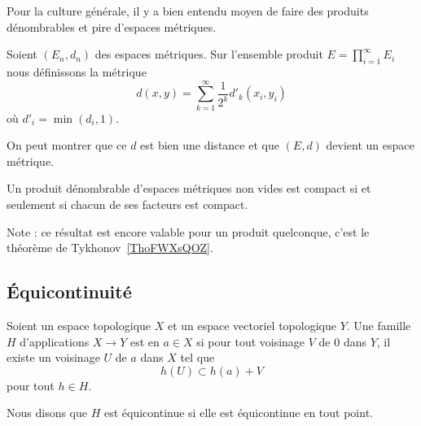 Pour la culture générale, il y a bien entendu moyen de faire des produits dénombrables et pire d'espaces métriques.
\begin{definition}
	Soient \( (E_n,d_n)\) des espaces métriques. Sur l'ensemble produit \( E=\prod_{i=1}^{\infty}E_i\) nous définissons la métrique
	\begin{equation}
		d(x,y)=\sum_{k=1}^{\infty}\frac{1}{ 2^k }d'_k(x_i,y_i)
	\end{equation}
	où \( d'_i=\min(d_i,1)\).
\end{definition}
On peut montrer que ce \( d\) est bien une distance et que \( (E,d)\) devient un espace métrique.

\begin{theorem} \label{ThoKKBooNaZgoO}  %
	Un produit dénombrable d'espaces métriques non vides est compact si et seulement si chacun de ses facteurs est compact.
\end{theorem}
Note : ce résultat est encore valable pour un produit quelconque, c'est le théorème de Tykhonov~\ref{ThoFWXsQOZ}.

\subsection{Équicontinuité}

\begin{definition}        \label{DEFooDHQDooFfIvsX}
    Soient un espace topologique \( X\) et un espace vectoriel topologique \( Y\). Une famille \( H\) d'applications \( X\to Y\) est  en \( a\in X\) si pour tout voisinage \( V\) de \( 0\) dans \( Y\), il existe un voisinage \( U\) de \( a\) dans \( X\) tel que 
    \begin{equation}
        h(U)\subset h(a)+V
    \end{equation}
    pour tout \( h\in H\).

    Nous disons que \( H\) est équicontinue si elle est équicontinue en tout point.
\end{definition}

